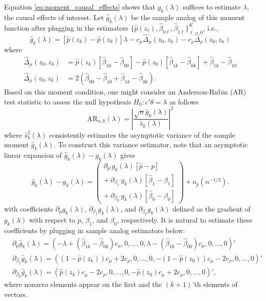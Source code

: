 \documentclass[11pt]{article}
\theoremstyle{definition}
\newcommand{\0}{\ensuremath{\mathbf{0}}}
\begin{document}
\begin{bibunit}
Equation \eqref{eq:moment_causal_effects} shows that $g_k(\lambda)$ suffices to estimate $\lambda$, the causal effects of interest. Let $\hat{g}_k(\lambda)$ be the sample analog of this moment function after plugging in the estimators $\{\hat{p}(z_\ell), \hat{\beta}_{0\ell}, \hat{\beta}_{1\ell}\}_{\ell = 0}^{K}$, i.e., 
\[
	\hat{g}_k(\lambda) = \left[\hat{p}(z_k) - \hat{p}(z_0)\right]\lambda - c_\mu\hat{\Delta}_\mu(z_0,z_k) - c_\rho \hat{\Delta}_\rho(z_0,z_k)
\]
where
\begin{align*}
	\hat{\Delta}_\mu(z_0,z_k) &= \hat{p}(z_k)[\hat{\beta}_{10} - \hat{\beta}_{00}] - \hat{p}(z_0)[\hat{\beta}_{1k} - \hat{\beta}_{0k}] + \hat{\beta}_{1k} - \hat{\beta}_{10} \\
	\hat{\Delta}_\rho(z_0, z_k) &= 2(\hat{\beta}_{00} - \hat{\beta}_{10} + \hat{\beta}_{1k} - \hat{\beta}_{0k}).
\end{align*}
Based on this moment condition, one might consider an Anderson-Rubin (AR) test statistic to assess the null hypothesis $H_0: c'\theta = \lambda$ as follows
\begin{equation}
\label{eq:linearMTE_AR_stat}
    \text{AR}_{n,k}(\lambda) = \left|\frac{\sqrt{n}\hat{g}_k(\lambda)}{\hat{s}_{k}(\lambda)}\right|^2
\end{equation}
where $\hat{s}_{k}^2(\lambda)$ consistently estimates the asymptotic variance of the sample moment $\hat{g}_k(\lambda)$. To construct this variance estimator, note that an asymptotic linear expansion of $\hat{g}_k(\lambda) - g_k(\lambda)$ gives
\[
	\hat{g}_k(\lambda) - g_k(\lambda) = 
	\begin{pmatrix}
	\partial_{p'} {g}_k(\lambda)[\hat{p} - p] \\
	+ ~\partial_{\beta_1'} {g}_k(\lambda)[\hat{\beta}_1 - \beta_1] \\
	+ ~\partial_{\beta_0'} {g}_k(\lambda)[\hat{\beta}_0 - \beta_0]
	\end{pmatrix}
	+ o_p(n^{-1/2}).
\]
with coefficients $\partial_{p} {g}_k(\lambda)$, $\partial_{\beta_1} {g}_k(\lambda)$, and $\partial_{\beta_0}{g}_k(\lambda)$ defined as the gradient of ${g}_k(\lambda)$ with respect to $p$, $\beta_1$, and $\beta_0$, respectively. It is natural to estimate these coefficients by plugging in sample analog estimators below:
\begin{equation}
\label{eq:fixed_weight_expansion}
\begin{aligned}
	& \partial_{p} \hat{g}_k(\lambda) = (-\lambda + (\hat{\beta}_{1k} - \hat{\beta}_{0k})c_\mu, 0, \ldots, 0, \lambda - (\hat{\beta}_{10} - \hat{\beta}_{00})c_\mu, 0, \ldots, 0)' \\
	& \partial_{\beta_1} \hat{g}_k(\lambda) = ((1-\hat{p}(z_k))c_\mu + 2c_\rho, 0, \ldots, 0, -(1-\hat{p}(z_0))c_\mu - 2c_\rho, 0, \ldots, 0)' \\
	& \partial_{\beta_0} \hat{g}_k(\lambda) = (\hat{p}(z_k)c_\mu - 2c_\rho, 0, \ldots, 0, -\hat{p}(z_0)c_\mu + 2c_\rho, 0, \ldots, 0)',
\end{aligned}
\end{equation}
where nonzero elements appear on the first and the $(k+1)$'th elements of vectors.


\end{bibunit}
\end{document}
